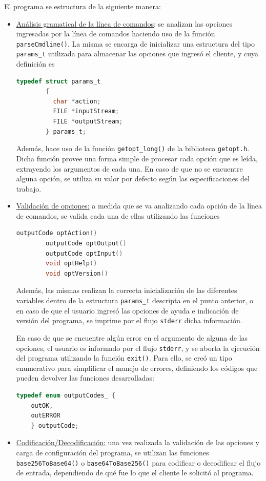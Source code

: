 El programa se estructura de la siguiente manera:
\begin{itemize}
	\item \underline{Análisis gramatical de la línea de comandos}: se analizan las opciones ingresadas por la línea de comandos haciendo uso de la función \texttt{parseCmdline()}. La misma se encarga de inicializar una estructura del tipo \texttt{params\_t} utilizada para almacenar las opciones que ingresó el cliente, y cuya definición es
	\begin{lstlisting}[language=C, style=StyleC]
    	typedef struct params_t
        {
          char *action;
          FILE *inputStream;
          FILE *outputStream;
        } params_t;
	\end{lstlisting}
	Además, hace uso de la función \texttt{getopt\_long()} de la biblioteca \texttt{getopt.h}. Dicha función provee una forma simple de procesar cada opción que es leída, extrayendo los argumentos de cada una. En caso de que no se encuentre alguna opción, se utiliza su valor por defecto según las especificaciones del trabajo.

	\item \underline{Validación de opciones:} a medida que se va analizando cada opción de la línea de comandos, se valida cada una de ellas utilizando las funciones
	\begin{lstlisting}[language=C, style=StyleC]
    	outputCode optAction()
        outputCode optOutput()
        outputCode optInput()
        void optHelp()
        void optVersion()
    \end{lstlisting}
    Además, las mismas realizan la correcta inicialización de las diferentes variables dentro de la estructura \texttt{params\_t} descripta en el punto anterior, o en caso de que el usuario ingresó las opciones de ayuda e indicación de versión del programa, se imprime por el flujo \texttt{stderr} dicha información.

	En caso de que se encuentre algún error en el argumento de alguna de las opciones, el usuario es informado por el flujo \texttt{stderr}, y se aborta la ejecución del programa utilizando la función \texttt{exit()}. Para ello, se creó un tipo enumerativo para simplificar el manejo de errores, definiendo los códigos que pueden devolver las funciones desarrolladas:
	\begin{lstlisting}[language=C, style=StyleC]
	typedef enum outputCodes_ {
	outOK,
	outERROR
	} outputCode;
	\end{lstlisting}

	\item \underline{Codificación/Decodificación:} una vez realizada la validación de las opciones y carga de configuración del programa, se utilizan las funciones \texttt{base256ToBase64()} o \texttt{base64ToBase256()} para codificar o decodificar el flujo de entrada, dependiendo de qué fue lo que el cliente le solicitó al programa.


\end{itemize}
